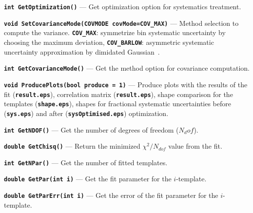 \documentclass[12pt]{article}
\newcommand\verbbf[1]{\textcolor[rgb]{0,0,1}{\texttt{\textbf{#1}}}}
\newcommand\verbbfb[1]{\textcolor[rgb]{0,0,0}{\texttt{\textbf{#1}}}}
\begin{document}
\vspace{0.3cm}

\noindent \verbbf{int GetOptimization()} --- Get optimization option
for systematics treatment.

\vspace{0.3cm}

\noindent \verbbf{void SetCovarianceMode(COVMODE covMode=COV\_MAX)} ---
Method selection to compute the variance. \verbbfb{COV\_MAX}:
symmetrize bin systematic uncertainty by choosing the maximum deviation,
\verbbfb{COV\_BARLOW}: asymmetric systematic uncertainty approximation 
by dimidated Gaussian~\cite{Barlow}.

\vspace{0.3cm}

\noindent \verbbf{int GetCovarianceMode()} --- Get the method option for
covariance computation.

\vspace{0.3cm}

\noindent \verbbf{void ProducePlots(bool produce = 1)} --- Produce plots
with the results of the fit (\verbbfb{result.eps}), 
correlation matrix (\verbbfb{result.eps}), shape comparison for the
templates (\verbbfb{shape.eps}), shapes for fractional systematic
uncertainties before (\verbbfb{sys.eps}) and after
(\verbbfb{sysOptimised.eps}) optimization.

\vspace{0.3cm}

\noindent \verbbf{int GetNDOF()} --- Get the number of degrees of freedom
($N_dof$).

\vspace{0.3cm}

\noindent \verbbf{double GetChisq()} --- Return the
minimized $\chi^{2}/N_{dof}$ value from the fit.

\vspace{0.3cm}

\noindent \verbbf{int GetNPar()} --- Get the number of fitted templates.

\vspace{0.3cm}

\noindent \verbbf{double GetPar(int i)} --- Get the fit parameter for
the $i$-template.

\vspace{0.3cm}

\noindent \verbbf{double GetParErr(int i)} --- Get the error of the
fit parameter for the $i$-template.

\vspace{0.3cm}
\end{document}
